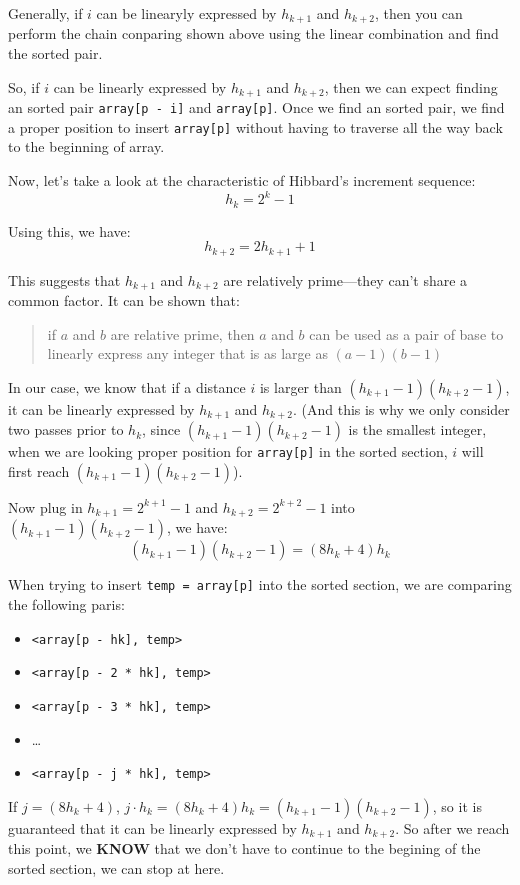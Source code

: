 \documentclass[11pt]{book}
\begin{document}
Generally, if \(i\) can be linearyly expressed by \(h_{k + 1}\) and \(h_{k + 2}\), then you can perform the chain conparing shown above using the linear combination and find the sorted pair.

So, if \(i\) can be linearly expressed by \(h_{k + 1}\) and \(h_{k + 2}\), then we can expect finding an sorted pair \texttt{array[p - i]} and \texttt{array[p]}. Once we find an sorted pair, we find a proper position to insert \texttt{array[p]} without having to traverse all the way back to the beginning of array.

Now, let's take a look at the characteristic of Hibbard's increment sequence:
\[
h_k = 2^k - 1
\]

Using this, we have:
\[
h_{k + 2} = 2h_{k + 1} + 1
\]

This suggests that \(h_{k + 1}\) and \(h_{k + 2}\) are relatively prime---they can't share a common factor. It can be shown that:
\begin{quote}
if \(a\) and \(b\) are relative prime, then \(a\) and \(b\) can be used as a pair of base to linearly express any integer that is as large as \((a - 1)(b - 1)\)
\end{quote}

In our case, we know that if a distance \(i\) is larger than \((h_{k + 1} - 1)(h_{k + 2} - 1)\), it can be linearly expressed by \(h_{k + 1}\) and \(h_{k + 2}\). (And this is why we only consider two passes prior to \(h_k\), since \((h_{k + 1} - 1)(h_{k + 2} - 1)\) is the smallest integer, when we are looking proper position for \texttt{array[p]} in the sorted section, \(i\) will first reach \((h_{k + 1} - 1)(h_{k + 2} - 1)\)).

Now plug in \(h_{k + 1} = 2^{k + 1} - 1\) and \(h_{k + 2} = 2^{k + 2} - 1\) into \((h_{k + 1} - 1)(h_{k + 2} - 1)\), we have:
\[
(h_{k + 1} - 1)(h_{k + 2} - 1) = (8h_k + 4)h_k
\]

When trying to insert \texttt{temp = array[p]} into the sorted section, we are comparing the following paris:
\begin{itemize}
\item \texttt{<array[p - hk], temp>}
\item \texttt{<array[p - 2 * hk], temp>}
\item \texttt{<array[p - 3 * hk], temp>}
\item \ldots{}
\item \texttt{<array[p - j * hk], temp>}
\end{itemize}

If \(j = (8h_k + 4)\), \(j \cdot h_k = (8h_k + 4) h_k = (h_{k + 1} - 1)(h_{k + 2} - 1)\), so it is guaranteed that it can be linearly expressed by \(h_{k + 1}\) and \(h_{k + 2}\). So after we reach this point, we \textbf{KNOW} that we don't have to continue to the begining of the sorted section, we can stop at here.
\end{document}
